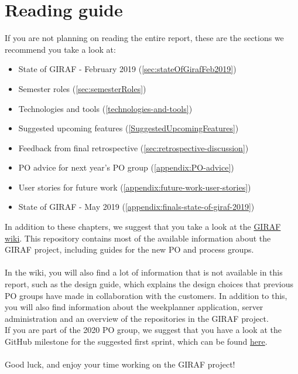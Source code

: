 \chapter*{Reading guide}
If you are not planning on reading the entire report, these are the sections we recommend you take a look at:

\begin{itemize}
    \item State of GIRAF - February 2019 (\autoref{sec:stateOfGirafFeb2019})
    \item Semester roles (\autoref{sec:semesterRoles})
    \item Technologies and tools (\autoref{technologies-and-tools})
    \item Suggested upcoming features (\autoref{SuggestedUpcomingFeatures})
    \item Feedback from final retrospective (\autoref{sec:retrospective-discussion})
    \item PO advice for next year's PO group (\autoref{appendix:PO-advice})
    \item User stories for future work (\autoref{appendix:future-work-user-stories})
    \item State of GIRAF - May 2019 (\autoref{appendix:finals-state-of-giraf-2019})

\end{itemize}
\noindent
In addition to these chapters, we suggest that you take a look at the \href{https://github.com/aau-giraf/wiki}{GIRAF wiki}.
This repository contains most of the available information about the GIRAF project, including guides for the new PO and process groups.
\\\\
In the wiki, you will also find a lot of information that is not available in this report, such as the design guide, which explains the design choices that previous PO groups have made in collaboration with the customers.
In addition to this, you will also find information about the weekplanner application, server administration and an overview of the repositories in the GIRAF project.
\\
If you are part of the 2020 PO group, we suggest that you have a look at the GitHub milestone for the suggested first sprint, which can be found \href{https://github.com/issues?utf8=%E2%9C%93&q=milestone%3A%222020S1%22+user%3Aaau-giraf+is%3Aopen+}{here}.
\\\\
Good luck, and enjoy your time working on the GIRAF project!
